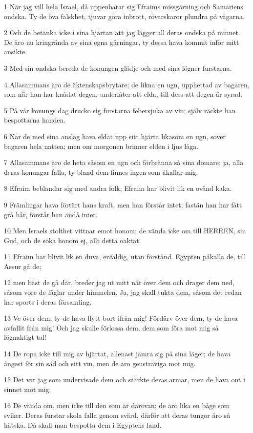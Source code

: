 \par 1 När jag vill hela Israel, då uppenbarar sig Efraims missgärning och Samariens ondska. Ty de öva falskhet, tjuvar göra inbrott, rövarskaror plundra på vägarna.
\par 2 Och de betänka icke i sina hjärtan att jag lägger all deras ondska på minnet. De äro nu kringrända av sina egna gärningar, ty dessa hava kommit inför mitt ansikte.
\par 3 Med sin ondska bereda de konungen glädje och med sina lögner furstarna.
\par 4 Allasammans äro de äktenskapsbrytare; de likna en ugn, upphettad av bagaren, som när han har knådat degen, underlåter att elda, till dess att degen är syrad.
\par 5 På vår konungs dag drucko sig furstarna febersjuka av vin; själv räckte han bespottarna handen.
\par 6 När de med sina anslag hava eldat upp sitt hjärta likasom en ugn, sover bagaren hela natten; men om morgonen brinner elden i ljus låga.
\par 7 Allasammans äro de heta såsom en ugn och förbränna så sina domare; ja, alla deras konungar falla, ty bland dem finnes ingen som åkallar mig.
\par 8 Efraim beblandar sig med andra folk; Efraim har blivit lik en ovänd kaka.
\par 9 Främlingar hava förtärt hans kraft, men han förstår intet; fastän han har fått grå hår, förstår han ändå intet.
\par 10 Men Israels stolthet vittnar emot honom; de vända icke om till HERREN, sin Gud, och de söka honom ej, allt detta oaktat.
\par 11 Efraim har blivit lik en duva, enfaldig, utan förstånd. Egypten påkalla de, till Assur gå de;
\par 12 men bäst de gå där, breder jag ut mitt nät över dem och drager dem ned, såsom vore de fåglar under himmelen. Ja, jag skall tukta dem, såsom det redan har sports i deras församling.
\par 13 Ve över dem, ty de hava flytt bort ifrån mig! Fördärv över dem, ty de hava avfallit från mig! Och jag skulle förlossa dem, dem som föra mot mig så lögnaktigt tal!
\par 14 De ropa icke till mig av hjärtat, allenast jämra sig på sina läger; de hava ångest för sin säd och sitt vin, men de äro gensträviga mot mig.
\par 15 Det var jag som undervisade dem och stärkte deras armar, men de hava ont i sinnet mot mig.
\par 16 De vända om, men icke till den som är därovan; de äro lika en båge som sviker. Deras furstar skola falla genom svärd, därför att deras tungor äro så hätska. Då skall man bespotta dem i Egyptens land.

